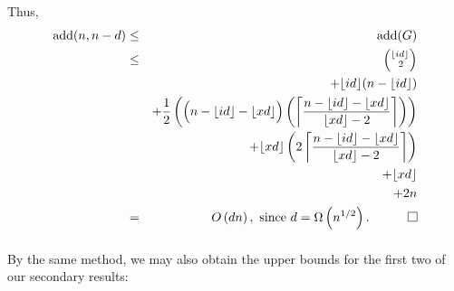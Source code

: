 \documentclass{article}
\newtheorem{Proof of Theorem}{Proof of Theorem}
\begin{document}
Thus,
\begin{eqnarray*}
\textrm{add}(n,n-d) 
& \leq & \textrm{add}(G) \\
& \leq & \left( ^{\lfloor id \rfloor}_{\phantom{w}2} \right) \\
& & + \lfloor id \rfloor (n - \lfloor id \rfloor) \\
& & +\frac{1}{2} \left( \Big( n - \lfloor id \rfloor - \lfloor xd \rfloor \Big)
\left( \left \lceil 
\frac{n - \lfloor id \rfloor - \lfloor xd \rfloor}{ \lfloor xd \rfloor - 2} 
\right \rceil \right) \right) \\
& & + \lfloor xd \rfloor 
\left( 2 \left \lceil 
\frac{n - \lfloor id \rfloor - \lfloor xd \rfloor}{ \lfloor xd \rfloor - 2} 
\right \rceil \right) \\
& & + \lfloor xd \rfloor \\
& & + 2n \\
& = & O \left( dn \right), \textrm{ since } d = \Omega \left( n^{1/2} \right).
\phantom{qwerty} 
\setlength{\unitlength}{.25cm}
\begin{picture}(1,1)
\put(0,0){\line(1,0){1}}
\put(0,0){\line(0,1){1}}
\put(1,1){\line(-1,0){1}}
\put(1,1){\line(0,-1){1}}
\end{picture}
\end{eqnarray*}
\begin{displaymath}
\end{displaymath} 















By the same method, 
we may also obtain the upper bounds for the first two of our secondary results:
\end{document}
